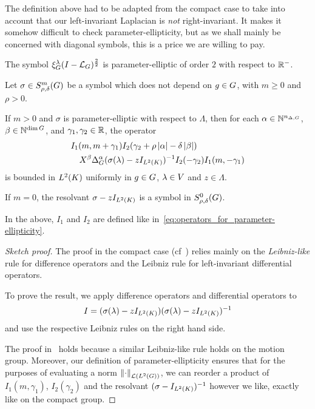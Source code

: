 The definition above had to be adapted from the compact case
to take into account that our left-invariant Laplacian is \emph{not} right-invariant.
It makes it somehow difficult to check parameter-ellipticity,
but as we shall mainly be concerned with diagonal symbols,
this is a price we are willing to pay.

\begin{example}
    The symbol $\Rep \lambda \BesselPotential 2$ is parameter-elliptic of order $2$ with respect to $\R^-$.
\end{example}

\begin{lemma}
    Let $\sigma \in \SymbolClass m {\rho, \delta}$ be a symbol which does not depend on $g \in \Group$,
    with $m \geq 0$ and $\rho > 0$.

    If $m > 0$ and $\sigma$ is parameter-elliptic with respect to $\Lambda$, then
    for each $\alpha \in \N^{\dimDifferenceOperators}$, $\beta \in \N^{\dim \Group}$, and $\gamma_1, \gamma_2 \in \R$,
    the operator
    \begin{align*}
        &I_1(m, m + \gamma_1)
        I_2(\gamma_2 + \rho \abs \alpha - \delta \abs \beta)\\
        &\quad
        \LeftDifferentialOperator \beta
        \DifferenceOperatorOrder \alpha (\sigma(\lambda) - z \Id {\Lebesgue 2 \CompactGroup})^{-1}
        I_2(-\gamma_2)
        I_1(m, -\gamma_1)
    \end{align*}
    is bounded in $\Lebesgue 2 \CompactGroup$ uniformly in $g \in \Group$, $\lambda \in \VectorSpace$ and $z \in \Lambda$.

    If $m = 0$,
    the resolvant $\sigma - z \Id {\Lebesgue 2 \CompactGroup}$ is a symbol in $\SymbolClass 0 {\rho, \delta}$.

    In the above, $I_1$ and $I_2$ are defined like in~\eqref{eq:operators_for_parameter-ellipticity}.
\end{lemma}
\begin{proof}[Sketch proof]
    The proof in the compact case (cf~\cite[Theorem 3.1. (1)]{RuzhanskyWirth14}) relies mainly on the \emph{Leibniz-like} rule for difference operators
    and the Leibniz rule for left-invariant differential operators.

    To prove the result, we apply difference operators and differential operators to
    \begin{align*}
        I = (\sigma(\lambda) - z \Id {\Lebesgue 2 \CompactGroup}) (\sigma(\lambda) - z \Id {\Lebesgue 2 \CompactGroup})^{-1}
    \end{align*}
    and use the respective Leibniz rules on the right hand side.

    The proof in~\cite{RuzhanskyWirth14} holds because a similar Leibniz-like rule holds on the motion group.
    Moreover, our definition of parameter-ellipticity ensures that for the purposes of evaluating a norm $\norm [\Lin {\Lebesgue 2 \Group}] \dummy$,
    we can reorder a product of $I_1(m, \gamma_1)$, $I_2(\gamma_2)$ and the resolvant $(\sigma - \Id {\Lebesgue 2 \CompactGroup})^{-1}$ however we like,
    exactly like on the compact group.
\end{proof}

